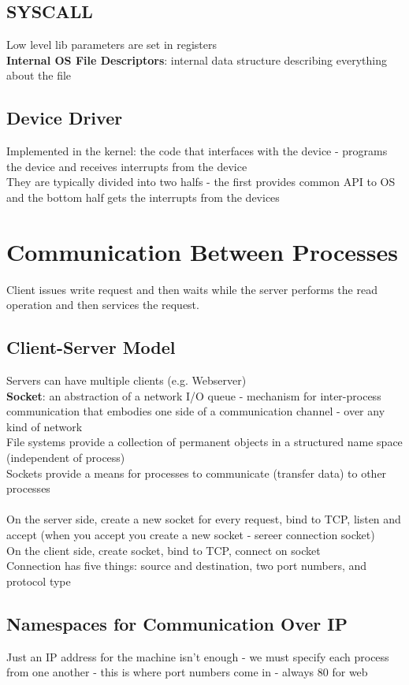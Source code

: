 \documentclass{article}
\begin{document}
\subsection{SYSCALL}
Low level lib parameters are set in registers \\
\textbf{Internal OS File Descriptors}: internal data structure describing everything about the file
\subsection{Device Driver}
Implemented in the kernel: the code that interfaces with the device - programs the device and receives interrupts from the device  \\ 
They are typically divided into two halfs - the first provides common API to OS and the bottom half gets the interrupts from the devices \\
\section{Communication Between Processes}
Client issues write request and then waits while the server performs the read operation and then services the request.
\subsection{Client-Server Model}
Servers can have multiple clients (e.g. Webserver) \\
\textbf{Socket}: an abstraction of a network I/O queue - mechanism for inter-process communication that embodies one side of a communication channel - over any kind of network \\
File systems provide a collection of permanent objects in a structured name space (independent of process) \\
Sockets provide a means for processes to communicate (transfer data) to other processes \\ \\
On the server side, create a new socket for every request, bind to TCP, listen and accept (when you accept you create a new socket - sereer connection socket) \\
On the client side, create socket, bind to TCP, connect on socket \\
Connection has five things: source and destination, two port numbers, and protocol type 
\subsection{Namespaces for Communication Over IP}
Just an IP address for the machine isn't enough - we must specify each process from one another - this is where port numbers come in - always 80 for web
\end{document}
